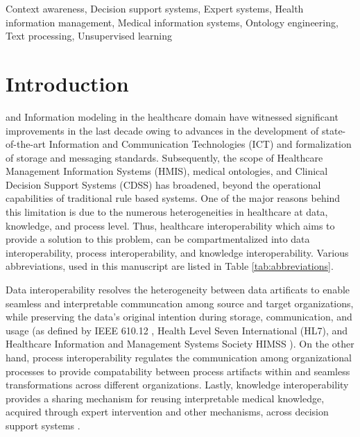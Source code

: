 \documentclass{ieeeaccess}
\begin{document}
\begin{keywords}
Context awareness, Decision support systems, Expert systems, Health information management, Medical information systems, Ontology engineering, Text processing, Unsupervised learning
\end{keywords}

\titlepgskip=-15pt

\maketitle

\section{Introduction}
\label{intro}
 and Information modeling in the healthcare domain have witnessed significant improvements in the last decade owing to advances in the development of state-of-the-art Information and Communication Technologies (ICT) and formalization of storage and messaging standards. Subsequently, the scope of Healthcare Management Information Systems (HMIS), medical ontologies, and Clinical Decision Support Systems (CDSS) has broadened, beyond the operational capabilities of traditional rule based systems. One of the major reasons behind this limitation is due to the numerous heterogeneities in healthcare at data, knowledge, and process level. Thus, healthcare interoperability which aims to provide a solution to this problem, can be compartmentalized into data interoperability, process interoperability, and knowledge interoperability. Various abbreviations, used in this manuscript are listed in Table \ref{tab:abbreviations}.

Data interoperability resolves the heterogeneity between data artificats to enable seamless and interpretable communcation among source and target organizations, while preserving the data's original intention during storage, communication, and usage (as defined by IEEE 610.12 \cite{geraci1991ieee}, Health Level Seven International (HL7), and Healthcare Information and Management Systems Society HIMSS \cite{Himss_url2013}).
On the other hand, process interoperability regulates the communication among organizational processes to provide compatability between process artifacts within and seamless transformations across different organizations\cite{khan2013process}. Lastly, knowledge interoperability provides a sharing mechanism for reusing interpretable medical knowledge, acquired through expert intervention and other mechanisms, across decision support systems \cite{ali2017multi}.
\end{document}
